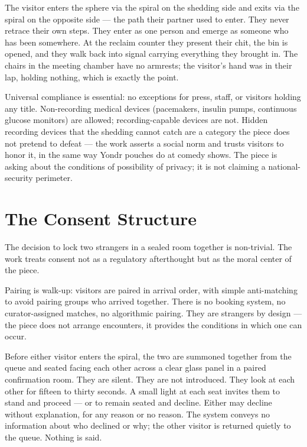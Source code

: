 \documentclass[10pt, letterpaper]{article}
\begin{document}
The visitor enters the sphere via the spiral on the shedding side and exits via the spiral on the opposite side --- the path their partner used to enter. They never retrace their own steps. They enter as one person and emerge as someone who has been somewhere. At the reclaim counter they present their chit, the bin is opened, and they walk back into signal carrying everything they brought in. The chairs in the meeting chamber have no armrests; the visitor's hand was in their lap, holding nothing, which is exactly the point.

Universal compliance is essential: no exceptions for press, staff, or visitors holding any title. Non-recording medical devices (pacemakers, insulin pumps, continuous glucose monitors) are allowed; recording-capable devices are not. Hidden recording devices that the shedding cannot catch are a category the piece does not pretend to defeat --- the work asserts a social norm and trusts visitors to honor it, in the same way Yondr pouches do at comedy shows. The piece is asking about the conditions of possibility of privacy; it is not claiming a national-security perimeter.

\section{The Consent Structure}

The decision to lock two strangers in a sealed room together is non-trivial. The work treats consent not as a regulatory afterthought but as the moral center of the piece.

Pairing is walk-up: visitors are paired in arrival order, with simple anti-matching to avoid pairing groups who arrived together. There is no booking system, no curator-assigned matches, no algorithmic pairing. They are strangers by design --- the piece does not arrange encounters, it provides the conditions in which one can occur.

Before either visitor enters the spiral, the two are summoned together from the queue and seated facing each other across a clear glass panel in a paired confirmation room. They are silent. They are not introduced. They look at each other for fifteen to thirty seconds. A small light at each seat invites them to stand and proceed --- or to remain seated and decline. Either may decline without explanation, for any reason or no reason. The system conveys no information about who declined or why; the other visitor is returned quietly to the queue. Nothing is said.
\end{document}
